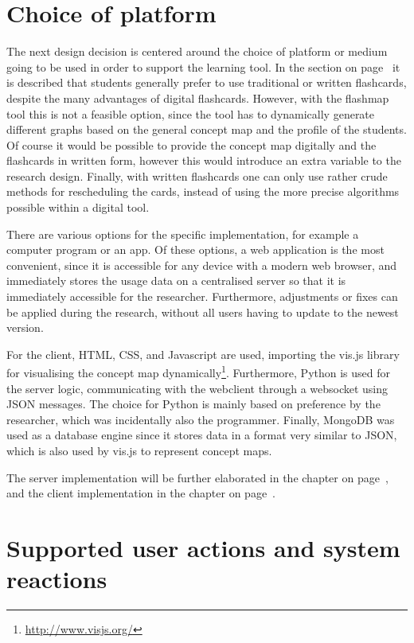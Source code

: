 \section{Choice of platform}

The next design decision is centered around the choice of platform or medium going to be used in order to support the learning tool. In the section  on page~\pageref{subsec:fcapplication} it is described that students generally prefer to use traditional or written flashcards, despite the many advantages of digital flashcards. However, with the flashmap tool this is not a feasible option, since the tool has to dynamically generate different graphs based on the general concept map and the profile of the students. Of course it would be possible to provide the concept map digitally and the flashcards in written form, however this would introduce an extra variable to the research design. Finally, with written flashcards one can only use rather crude methods for rescheduling the cards, instead of using the more precise algorithms possible within a digital tool.

There are various options for the specific implementation, for example a computer program or an app. Of these options, a web application is the most convenient, since it is accessible for any device with a modern web browser, and immediately stores the usage data on a centralised server so that it is immediately accessible for the researcher. Furthermore, adjustments or fixes can be applied during the research, without all users having to update to the newest version.

For the client, HTML, CSS, and Javascript are used, importing the vis.js library for visualising the concept map dynamically\footnote{\url{http://www.visjs.org/}}. Furthermore, Python is used for the server logic, communicating with the webclient through a websocket using JSON messages. The choice for Python is mainly based on preference by the researcher, which was incidentally also the programmer. Finally, MongoDB was used as a database engine since it stores data in a format very similar to JSON, which is also used by vis.js to represent concept maps.

The server implementation will be further elaborated in the  chapter on page~\pageref{ch:server}, and the client implementation in the  chapter on page~\pageref{ch:client}.

\section{Supported user actions and system reactions}


